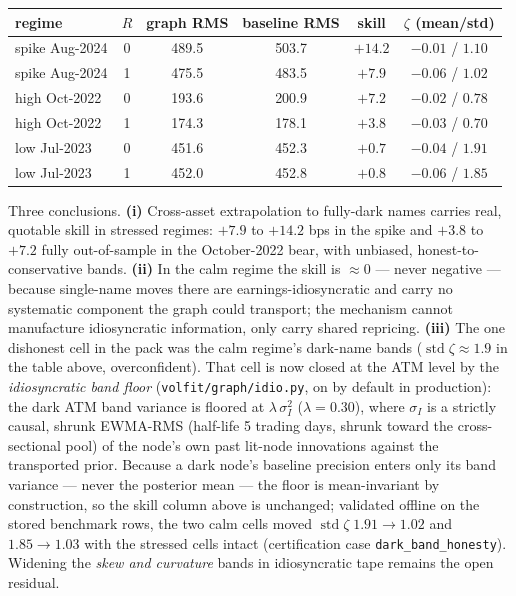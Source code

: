 \documentclass[11pt]{article}
\begin{document}
\begin{center}\small
\begin{tabular}{@{}lccccc@{}}
\toprule
regime & $R$ & graph RMS & baseline RMS & skill & $\zeta$ (mean/std)\\
\midrule
spike Aug-2024 & 0 & 489.5 & 503.7 & $+14.2$ & $-0.01$ / $1.10$\\
spike Aug-2024 & 1 & 475.5 & 483.5 & $+7.9$  & $-0.06$ / $1.02$\\
high Oct-2022  & 0 & 193.6 & 200.9 & $+7.2$  & $-0.02$ / $0.78$\\
high Oct-2022  & 1 & 174.3 & 178.1 & $+3.8$  & $-0.03$ / $0.70$\\
low Jul-2023   & 0 & 451.6 & 452.3 & $+0.7$  & $-0.04$ / $1.91$\\
low Jul-2023   & 1 & 452.0 & 452.8 & $+0.8$  & $-0.06$ / $1.85$\\
\bottomrule
\end{tabular}
\end{center}

Three conclusions. \textbf{(i)} Cross-asset extrapolation to fully-dark names
carries real, quotable skill in stressed regimes: $+7.9$ to $+14.2$ bps in the
spike and $+3.8$ to $+7.2$ fully out-of-sample in the October-2022 bear, with
unbiased, honest-to-conservative bands. \textbf{(ii)} In the calm regime the
skill is $\approx0$ --- never negative --- because single-name moves there are
earnings-idiosyncratic and carry no systematic component the graph could
transport; the mechanism cannot manufacture idiosyncratic information, only
carry shared repricing. \textbf{(iii)} The one dishonest cell in the pack was
the calm regime's dark-name bands ($\operatorname{std}\zeta\approx1.9$ in the
table above, overconfident). That cell is now closed at the ATM level by the
\emph{idiosyncratic band floor} (\texttt{volfit/graph/idio.py}, on by default
in production): the dark ATM band variance is floored at
$\lambda\,\sigma_I^2$ ($\lambda=0.30$), where $\sigma_I$ is a strictly causal,
shrunk EWMA-RMS (half-life 5 trading days, shrunk toward the cross-sectional
pool) of the node's own past lit-node innovations against the transported
prior. Because a dark node's baseline precision enters only its band variance
--- never the posterior mean --- the floor is mean-invariant by construction,
so the skill column above is unchanged; validated offline on the stored
benchmark rows, the two calm cells moved
$\operatorname{std}\zeta\;1.91\to1.02$ and $1.85\to1.03$ with the stressed
cells intact (certification case \texttt{dark\_band\_honesty}). Widening the
\emph{skew and curvature} bands in idiosyncratic tape remains the open
residual.
\end{document}
